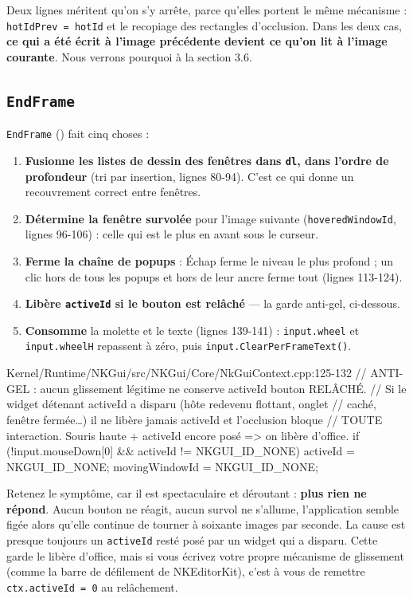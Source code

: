 Deux lignes méritent qu'on s'y arrête, parce qu'elles portent le même mécanisme :
\texttt{hotIdPrev = hotId} et le recopiage des rectangles d'occlusion. Dans les
deux cas, \textbf{ce qui a été écrit à l'image précédente devient ce qu'on lit à
l'image courante}. Nous verrons pourquoi à la section 3.6.

\subsection{\texttt{EndFrame}}

\texttt{EndFrame} () fait cinq choses :

\begin{enumerate}
  \item \textbf{Fusionne les listes de dessin des fenêtres dans \texttt{dl}, dans
        l'ordre de profondeur} (tri par insertion, lignes 80-94). C'est ce qui
        donne un recouvrement correct entre fenêtres.
  \item \textbf{Détermine la fenêtre survolée} pour l'image suivante
        (\texttt{hoveredWindowId}, lignes 96-106) : celle qui est le plus en
        avant sous le curseur.
  \item \textbf{Ferme la chaîne de popups} : Échap ferme le niveau le plus
        profond ; un clic hors de tous les popups et hors de leur ancre ferme
        tout (lignes 113-124).
  \item \textbf{Libère \texttt{activeId} si le bouton est relâché} — la garde
        anti-gel, ci-dessous.
  \item \textbf{Consomme} la molette et le texte (lignes 139-141) :
        \texttt{input.wheel} et \texttt{input.wheelH} repassent à zéro,
        puis \texttt{input.ClearPerFrameText()}.
\end{enumerate}

\begin{nkpiege}
\begin{nkcode}{Kernel/Runtime/NKGui/src/NKGui/Core/NkGuiContext.cpp:125-132}
// ANTI-GEL : aucun glissement légitime ne conserve activeId bouton RELÂCHÉ.
// Si le widget détenant activeId a disparu (hôte redevenu flottant, onglet
// caché, fenêtre fermée…) il ne libère jamais activeId et l'occlusion bloque
// TOUTE interaction. Souris haute + activeId encore posé => on libère d'office.
if (!input.mouseDown[0] && activeId != NKGUI_ID_NONE) {
    activeId = NKGUI_ID_NONE;
    movingWindowId = NKGUI_ID_NONE;
}
\end{nkcode}

Retenez le symptôme, car il est spectaculaire et déroutant : \textbf{plus rien ne
répond}. Aucun bouton ne réagit, aucun survol ne s'allume, l'application semble
figée alors qu'elle continue de tourner à soixante images par seconde. La cause
est presque toujours un \texttt{activeId} resté posé par un widget qui a
disparu. Cette garde le libère d'office, mais si vous écrivez votre propre
mécanisme de glissement (comme la barre de défilement de NKEditorKit), c'est à
vous de remettre \texttt{ctx.activeId = 0} au relâchement.
\end{nkpiege}

